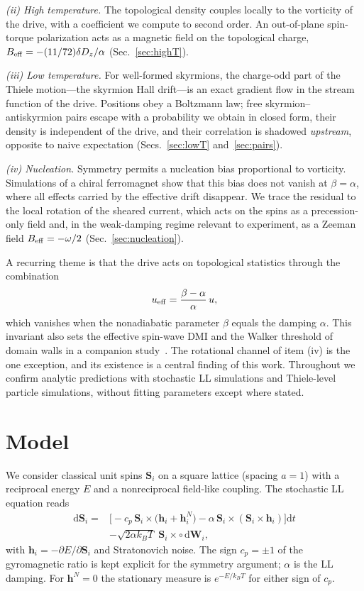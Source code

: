 \documentclass[aps,prb,twocolumn,superscriptaddress,longbibliography,floatfix]{revtex4-2}
\newcommand{\vS}{\mathbf S}
\newcommand{\vh}{\mathbf h}
\newcommand{\ueff}{u_{\rm eff}}
\newcommand{\kT}{k_BT}
\newcommand{\Beff}{B_{\rm eff}}
\newcommand{\dd}{\mathrm d}
\begin{document}
\emph{(ii) High temperature.} The topological density couples locally to the vorticity of the drive, with a coefficient we compute to second order. An out-of-plane spin-torque polarization acts as a magnetic field on the topological charge, $\Beff=-(11/72)\delta D_z/\alpha$ (Sec.~\ref{sec:highT}).

\emph{(iii) Low temperature.} For well-formed skyrmions, the charge-odd part of the Thiele motion---the skyrmion Hall drift---is an exact gradient flow in the stream function of the drive. Positions obey a Boltzmann law; free skyrmion--antiskyrmion pairs escape with a probability we obtain in closed form, their density is independent of the drive, and their correlation is shadowed \emph{upstream}, opposite to naive expectation (Secs.~\ref{sec:lowT} and~\ref{sec:pairs}).

\emph{(iv) Nucleation.} Symmetry permits a nucleation bias proportional to vorticity. Simulations of a chiral ferromagnet show that this bias does not vanish at $\beta=\alpha$, where all effects carried by the effective drift disappear. We trace the residual to the local rotation of the sheared current, which acts on the spins as a precession-only field and, in the weak-damping regime relevant to experiment, as a Zeeman field $\Beff=-\omega/2$ (Sec.~\ref{sec:nucleation}).

A recurring theme is that the drive acts on topological statistics through the combination
\begin{equation}
\ueff=\frac{\beta-\alpha}{\alpha}\,u ,
\label{eq:ueff}
\end{equation}
which vanishes when the nonadiabatic parameter $\beta$ equals the damping $\alpha$. This invariant also sets the effective spin-wave DMI and the Walker threshold of domain walls in a companion study~\cite{Companion}. The rotational channel of item (iv) is the one exception, and its existence is a central finding of this work. Throughout we confirm analytic predictions with stochastic LL simulations and Thiele-level particle simulations, without fitting parameters except where stated.

\section{Model}\label{sec:model}

We consider classical unit spins $\vS_i$ on a square lattice (spacing $a=1$) with a reciprocal energy $E$ and a nonreciprocal field-like coupling. The stochastic LL equation reads
\begin{align}
\dd\vS_i={}&\Big[-c_p\,\vS_i\times\big(\vh_i+\vh_i^{N}\big)-\alpha\,\vS_i\times(\vS_i\times\vh_i)\Big]\dd t\nonumber\\
&-\sqrt{2\alpha\kT}\;\vS_i\times\circ\,\dd\mathbf W_i ,
\label{eq:LL}
\end{align}
with $\vh_i=-\partial E/\partial\vS_i$ and Stratonovich noise. The sign $c_p=\pm1$ of the gyromagnetic ratio is kept explicit for the symmetry argument; $\alpha$ is the LL damping. For $\vh^N=0$ the stationary measure is $e^{-E/\kT}$ for either sign of $c_p$.
\end{document}
